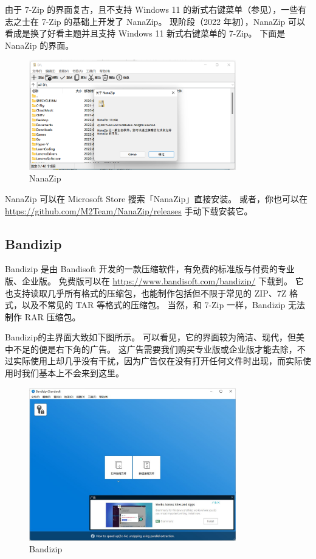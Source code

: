 由于 7-Zip 的界面复古，且不支持 Windows 11 的新式右键菜单（参见），一些有志之士在 7-Zip 的基础上开发了 NanaZip。
现阶段（2022 年初），NanaZip 可以看成是换了好看主题并且支持 Windows 11 新式右键菜单的 7-Zip。
下面是 NanaZip 的界面。

\begin{figure}[htb!]
  \centering
  \includegraphics[width=9cm]{assets/NanaZip.png}
  \caption{NanaZip}
  \label{NanaZip}
\end{figure}

NanaZip 可以在 Microsoft Store 搜索「NanaZip」直接安装。
或者，你也可以在 \url{https://github.com/M2Team/NanaZip/releases} 手动下载安装它。

\subsection{Bandizip}

Bandizip 是由 Bandisoft 开发的一款压缩软件，有免费的标准版与付费的专业版、企业版。
免费版可以在 \url{https://www.bandisoft.com/bandizip/} 下载到。
它也支持读取几乎所有格式的压缩包，也能制作包括但不限于常见的 ZIP、7Z 格式，以及不常见的 TAR 等格式的压缩包。
当然，和 7-Zip 一样，Bandizip 无法制作 RAR 压缩包。

Bandizip的主界面大致如下图所示。
可以看见，它的界面较为简洁、现代，但美中不足的便是右下角的广告。
这广告需要我们购买专业版或企业版才能去除，不过实际使用上却几乎没有干扰，因为广告仅在没有打开任何文件时出现，而实际使用时我们基本上不会来到这里。

\begin{figure}[htb!]
  \centering
  \includegraphics[width=9cm]{assets/Bandizip.jpg}
  \caption{Bandizip}
  \label{Bandizip}
\end{figure}

